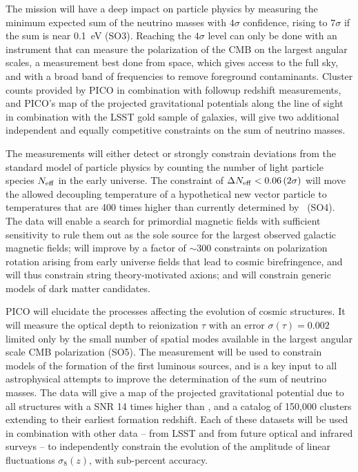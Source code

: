 \documentclass[PICOReport.tex]{subfiles}
\begin{document}
The mission will have a deep impact on particle physics by measuring the minimum expected sum of the neutrino masses with $4\sigma$ confidence, rising to $7\sigma$ if the sum is near 0.1~eV (SO3). Reaching the $4\sigma$ level can only be done with an instrument that can measure the polarization of the CMB on the largest angular scales, a measurement best done from space, which gives access to the full sky, and with a broad band of frequencies to remove foreground contaminants.  
Cluster counts provided by PICO in combination with followup redshift measurements, and PICO's map of the projected gravitational potentials along the line of sight in combination with the LSST gold sample of galaxies, will give two additional independent and equally competitive constraints on the sum of neutrino masses. 

The measurements will either detect or strongly constrain deviations from the standard model of particle physics by counting the number of light particle species $N_{\rm eff}$ in the early universe.  The constraint of $\Delta N_{\rm eff} < 0.06 \, (2\sigma)$ will move the allowed decoupling temperature of a hypothetical new vector particle to temperatures that are 400 times higher than currently determined by \planck\ (SO4). 
The data will enable a search for primordial magnetic fields with sufficient sensitivity to rule them out as the sole source for the largest observed galactic magnetic fields; will improve by a factor of $\sim$300 constraints on polarization rotation arising from early universe fields that lead to cosmic birefringence, and will thus constrain string theory-motivated axions; and will constrain generic models of dark matter candidates. 

PICO will elucidate the processes affecting the evolution of cosmic structures. It will measure the optical depth to reionization $\tau$ with an error $\sigma(\tau) = 0.002$ limited only by the small number of spatial modes available in the largest angular scale CMB polarization (SO5). The measurement will be used to constrain models of the formation of the first luminous sources, and is a key input to all astrophysical attempts to improve the determination of the sum of neutrino masses. The data will give a map of the projected gravitational potential due to all structures with a \ac{SNR} 14 times higher than \planck , and a catalog of 150,000 clusters extending to their earliest formation redshift. Each of these datasets will be used in combination with other data -- from LSST and from future optical and infrared surveys -- to independently constrain the evolution of the amplitude of linear fluctuations $\sigma_{8}(z)$, with sub-percent accuracy.  
\end{document}
